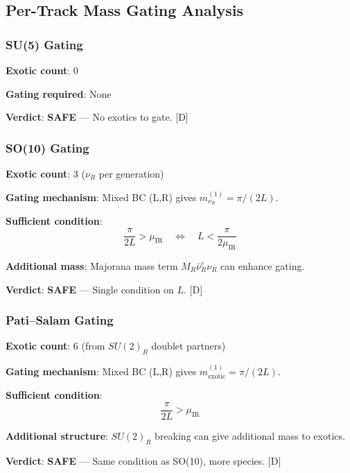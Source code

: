 \documentclass[11pt,a4paper]{article}
\newcommand{\tagD}{\textcolor{blue!70!black}{[D]}}
\begin{document}
\subsection{Per-Track Mass Gating Analysis}

\subsubsection{SU(5) Gating}

\begin{verdictbox}
\textbf{Exotic count}: 0

\textbf{Gating required}: None

\textbf{Verdict}: \textcolor{green!60!black}{\textbf{SAFE}} --- No exotics to gate.
\tagD
\end{verdictbox}

\subsubsection{SO(10) Gating}

\begin{verdictbox}
\textbf{Exotic count}: 3 ($\nu_R$ per generation)

\textbf{Gating mechanism}: Mixed BC (L,R) gives $m_{\nu_R}^{(1)} = \pi/(2L)$.

\textbf{Sufficient condition}:
\begin{equation}
\label{eq:so10-gate}
\frac{\pi}{2L} > \mu_{\text{IR}} \quad \Leftrightarrow \quad L < \frac{\pi}{2\mu_{\text{IR}}}
\end{equation}

\textbf{Additional mass}: Majorana mass term $M_R \bar{\nu}_R^c \nu_R$ can enhance gating.

\textbf{Verdict}: \textcolor{green!60!black}{\textbf{SAFE}} --- Single condition on $L$.
\tagD
\end{verdictbox}

\subsubsection{Pati--Salam Gating}

\begin{verdictbox}
\textbf{Exotic count}: 6 (from $SU(2)_R$ doublet partners)

\textbf{Gating mechanism}: Mixed BC (L,R) gives $m_{\text{exotic}}^{(1)} = \pi/(2L)$.

\textbf{Sufficient condition}:
\begin{equation}
\label{eq:ps-gate}
\frac{\pi}{2L} > \mu_{\text{IR}}
\end{equation}

\textbf{Additional structure}: $SU(2)_R$ breaking can give additional mass to exotics.

\textbf{Verdict}: \textcolor{green!60!black}{\textbf{SAFE}} --- Same condition as SO(10), more species.
\tagD
\end{verdictbox}
\end{document}
